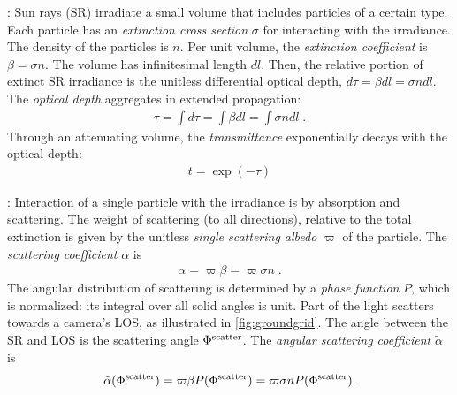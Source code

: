\documentclass[10pt,letterpaper]{article}
\begin{document}

: Sun rays (SR) irradiate a small volume
that includes particles of a certain type.  Each particle has an {\em
  extinction cross section} $\sigma$ for
interacting with the irradiance. The density of the particles is $n$. Per unit volume, the {\em extinction coefficient} is $\beta= \sigma n$.
The volume has infinitesimal length $dl$. Then, the relative portion
of extinct SR irradiance is the unitless differential optical
  depth, $d\tau= \beta dl=\sigma n dl$.
The {\em optical depth} aggregates in extended propagation:
\begin{align}
  \tau= \int d\tau=\int \beta dl=\int \sigma n dl \;.
  \label{eq:tau}
\end{align}
Through an attenuating volume, the {\em transmittance} exponentially
decays with the optical depth:
\begin{align}
  t=\exp(-\tau)
  \label{eq:beer-lambert}
\end{align}

: Interaction of a single particle with the
irradiance is by absorption and scattering. The weight of scattering
(to all directions), relative to the total extinction is given by the
unitless {\em single scattering albedo} $\varpi$ of the particle. The
{\em scattering coefficient} $\alpha$ is
\begin{align}
  \alpha= \varpi\beta=\varpi \sigma n \;.
  \label{eq:alph}
\end{align}
The angular distribution of scattering is determined by a {\em phase
  function} $P$, which is normalized: its integral over all solid
angles is unit. Part of the light scatters towards a camera's LOS, as
illustrated in \cref{fig:groundgrid}. The angle between the SR and LOS
is the scattering angle $\Phi^{\rm scatter}$. The {\em angular scattering coefficient}
$\tilde\alpha$ is
\begin{align}
  \tilde\alpha(\Phi^{\rm scatter}) = \varpi\beta P(\Phi^{\rm scatter})
  = \varpi \sigma n P(\Phi^{\rm scatter}).
  \label{eq:alphabasic}
\end{align}
\end{document}
